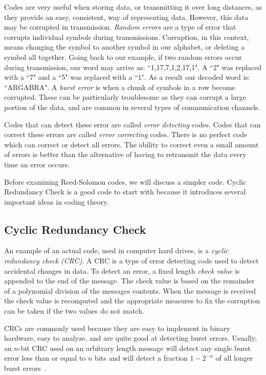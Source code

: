 \documentclass{article}
\begin{document}
Codes are very useful when storing data, or transmitting it over long distances, as they provide an easy, consistent, way of representing data. However, this data may be corrupted in transmission. \textit{Random errors} are a type of error that corrupts individual symbols during transmissions. Corruption, in this context, means changing the symbol to another symbol in our alphabet, or deleting a symbol all together. Going back to our example, if two random errors occur during transmission, our word may arrive as: ``1,17,7,1,2,17,1". A ``2" was replaced with a ``7" and a ``5" was replaced with a ``1". As a result our decoded word is: ``ARGABRA". A \textit{burst error} is when a chunk of symbols in a row become corrupted. These can be particularly troublesome as they can corrupt a large portion of the data, and are common in several types of communication channels.

Codes that can detect these error are called \textit{error detecting} codes. Codes that can correct these errors are called \textit{error correcting} codes. There is no perfect code which can correct or detect all errors. The ability to correct even a small amount of errors is better than the alternative of having to retransmit the data every time an error occurs.

Before examining Reed-Solomon codes, we will discuss a simpler code. Cyclic Redundancy Check is a good code to start with because it introduces several important ideas in coding theory. 

\subsection{Cyclic Redundancy Check}
An example of an actual code, used in computer hard drives, is a \textit{cyclic redundancy check (CRC)}. A CRC is a type of error detecting code used to detect accidental changes in data. To detect an error, a fixed length \textit{check value} is appended to the end of the message. The check value is based on the remainder of a polynomial division of the messages contents. When the message is received the check value is recomputed and the appropriate measures to fix the corruption can be taken if the two values do not match.

CRCs are commonly used because they are easy to implement in binary hardware, easy to analyze, and are quite good at detecting burst errors. Usually, an $n$-bit CRC used on an arbitrary length message will detect any single burst error less than or equal to $n$ bits and will detect a fraction $1 - 2^{-n}$ of all longer burst errors~\cite{wiki:crc}.
\end{document}
